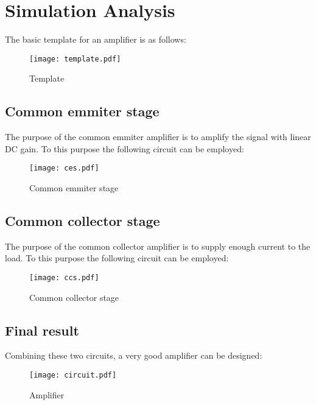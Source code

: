 \newpage

\section{Simulation Analysis}
\label{sec:simulation}

The basic template for an amplifier is as follows:

\begin{figure}[H]
        \centering
        \texttt{[image: template.pdf]}
        \caption{Template}
        \label{template}
\end{figure}

\subsection{Common emmiter stage}

The purpose of the common emmiter amplifier is to amplify the signal with linear DC gain. To this purpose the following circuit can be employed:

\begin{figure}[H]
        \centering
        \texttt{[image: ces.pdf]}
        \caption{Common emmiter stage}
        \label{ces}
\end{figure}

\subsection{Common collector stage}

The purpose of the common collector amplifier is to supply enough current to the load. To this purpose the following circuit can be employed:

\begin{figure}[H]
        \centering
        \texttt{[image: ccs.pdf]}
        \caption{Common collector stage}
        \label{ccs}
\end{figure}

\subsection{Final result}

Combining these two circuits, a very good amplifier can be designed:

\begin{figure}[H]
        \centering
        \texttt{[image: circuit.pdf]}
        \caption{Amplifier}
        \label{circuit}
\end{figure}

